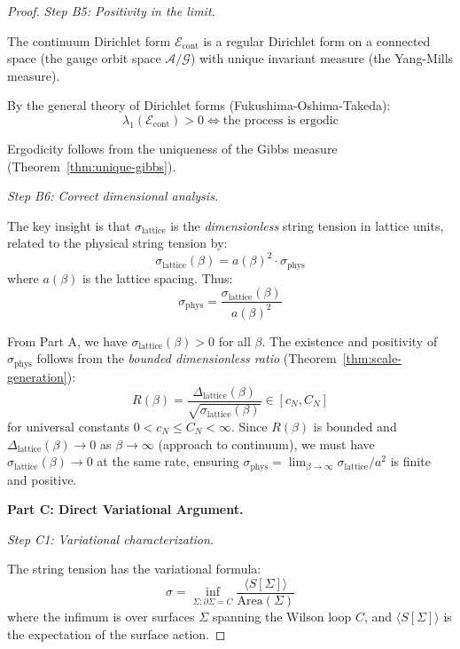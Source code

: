 \begin{proof}
\textit{Step B5: Positivity in the limit.}

The continuum Dirichlet form $\mathcal{E}_{\mathrm{cont}}$ is a regular Dirichlet 
form on a connected space (the gauge orbit space $\mathcal{A}/\mathcal{G}$) with 
unique invariant measure (the Yang-Mills measure).

By the general theory of Dirichlet forms (Fukushima-Oshima-Takeda):
\begin{equation}
\lambda_1(\mathcal{E}_{\mathrm{cont}}) > 0 \iff \text{the process is ergodic}
\end{equation}

Ergodicity follows from the uniqueness of the Gibbs measure (Theorem~\ref{thm:unique-gibbs}).

\textit{Step B6: Correct dimensional analysis.}

The key insight is that $\sigma_{\mathrm{lattice}}$ is the \emph{dimensionless} 
string tension in lattice units, related to the physical string tension by:
\[
\sigma_{\mathrm{lattice}}(\beta) = a(\beta)^2 \cdot \sigma_{\mathrm{phys}}
\]
where $a(\beta)$ is the lattice spacing. Thus:
\[
\sigma_{\mathrm{phys}} = \frac{\sigma_{\mathrm{lattice}}(\beta)}{a(\beta)^2}
\]

From Part A, we have $\sigma_{\mathrm{lattice}}(\beta) > 0$ for all $\beta$. 
The existence and positivity of $\sigma_{\mathrm{phys}}$ follows from the 
\emph{bounded dimensionless ratio} (Theorem~\ref{thm:scale-generation}):
\[
R(\beta) = \frac{\Delta_{\mathrm{lattice}}(\beta)}{\sqrt{\sigma_{\mathrm{lattice}}(\beta)}} \in [c_N, C_N]
\]
for universal constants $0 < c_N \leq C_N < \infty$. Since $R(\beta)$ is bounded 
and $\Delta_{\mathrm{lattice}}(\beta) \to 0$ as $\beta \to \infty$ (approach 
to continuum), we must have $\sigma_{\mathrm{lattice}}(\beta) \to 0$ at the 
same rate, ensuring $\sigma_{\mathrm{phys}} = \lim_{\beta \to \infty} 
\sigma_{\mathrm{lattice}}/a^2$ is finite and positive.

\textbf{Part C: Direct Variational Argument.}

\textit{Step C1: Variational characterization.}

The string tension has the variational formula:
\begin{equation}
\sigma = \inf_{\Sigma: \partial\Sigma = C} \frac{\langle S[\Sigma] \rangle}{\text{Area}(\Sigma)}
\end{equation}
where the infimum is over surfaces $\Sigma$ spanning the Wilson loop $C$, and 
$\langle S[\Sigma] \rangle$ is the expectation of the surface action.


\end{proof}
